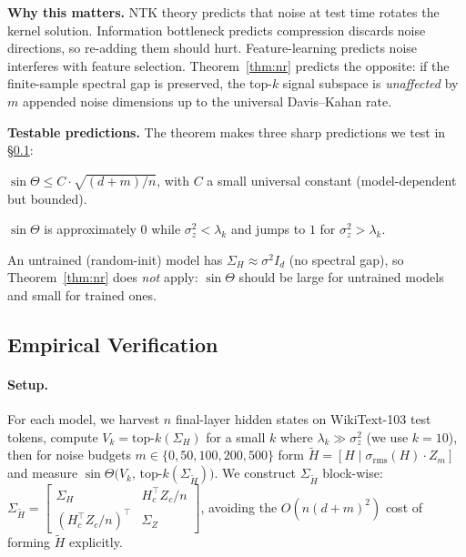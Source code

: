 \textbf{Why this matters.}
NTK theory predicts that noise at test time rotates the kernel solution.
Information bottleneck predicts compression discards noise directions, so
re-adding them should hurt.
Feature-learning predicts noise interferes with feature selection.
Theorem~\ref{thm:nr} predicts the opposite: if the finite-sample spectral
gap is preserved, the top-$k$ signal subspace is \emph{unaffected} by
$m$ appended noise dimensions up to the universal Davis--Kahan rate.

\textbf{Testable predictions.}
The theorem makes three sharp predictions we test in \S\ref{sec:nr-empirical}:
\begin{description}[leftmargin=1.8em,itemsep=1pt]
  \item[P1 (Davis--Kahan rate).]
    $\sin\Theta \leq C \cdot \sqrt{(d+m)/n}$, with $C$ a small universal
    constant (model-dependent but bounded).
  \item[P2 (Phase boundary).]
    $\sin\Theta$ is approximately $0$ while $\sigma_z^2 < \lambda_k$ and
    jumps to $1$ for $\sigma_z^2 > \lambda_k$.
  \item[P3 (Learning required).]
    An untrained (random-init) model has $\Sigma_H \approx \sigma^2 I_d$
    (no spectral gap), so Theorem~\ref{thm:nr} does \emph{not} apply:
    $\sin\Theta$ should be large for untrained models and small for
    trained ones.
\end{description}

\subsection{Empirical Verification}
\label{sec:nr-empirical}

\paragraph{Setup.}
For each model, we harvest $n$ final-layer hidden states on WikiText-103
test tokens, compute $V_k = \mathrm{top\text{-}}k(\Sigma_H)$ for a small
$k$ where $\lambda_k \gg \sigma_z^2$ (we use $k = 10$),
then for noise budgets $m \in \{0, 50, 100, 200, 500\}$ form $\tilde H = [H \mid \sigma_{\mathrm{rms}}(H) \cdot Z_m]$ and measure
$\sin\Theta\bigl(V_k,\, \mathrm{top\text{-}}k(\Sigma_{\tilde H})\bigr)$.
We construct $\Sigma_{\tilde H}$ block-wise:
$\Sigma_{\tilde H} = \begin{bmatrix}\Sigma_H & H_c^\top Z_c / n \\ (H_c^\top Z_c / n)^\top & \Sigma_Z\end{bmatrix}$,
avoiding the $O(n (d+m)^2)$ cost of forming $\tilde H$ explicitly.

